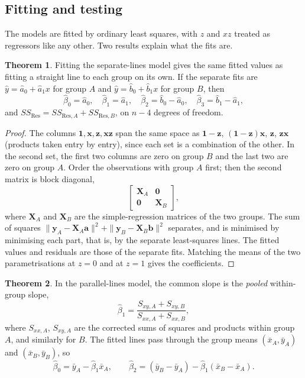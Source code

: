 \documentclass[11pt,a4paper]{article}
\numberwithin{equation}{section}
\theoremstyle{definition}
\newtheorem{thm}{Theorem}[subsection]
\begin{document}
\subsection{Fitting and testing}
The models are fitted by ordinary least squares, with $z$ and $xz$ treated as regressors like any other.
Two results explain what the fits are.

\begin{thm}\label{thm:separate-lines}
Fitting the separate-lines model gives the same fitted values as fitting a straight line to each group
on its own. If the separate fits are $\hat y = \hat a_0 + \hat a_1x$ for group $A$ and $\hat y = \hat b_0 + \hat b_1x$ for
group $B$, then
\[
\hat\beta_0 = \hat a_0, \quad \hat\beta_1 = \hat a_1, \quad \hat\beta_2 = \hat b_0 - \hat a_0, \quad \hat\beta_3 = \hat b_1 - \hat a_1 ,
\]
and $SS_{\mathrm{Res}} = SS_{\mathrm{Res},A} + SS_{\mathrm{Res},B}$, on $n - 4$ degrees of freedom.
\end{thm}

\begin{proof}
The columns $\mathbf{1}, \mathbf{x}, \mathbf{z}, \mathbf{xz}$ span the same space as $\mathbf{1} - \mathbf{z}$, $(\mathbf{1} - \mathbf{z})\mathbf{x}$,
$\mathbf{z}$, $\mathbf{zx}$ (products taken entry by entry), since each set is a combination of the other. In the
second set, the first two columns are zero on group $B$ and the last two are zero on group $A$. Order the
observations with group $A$ first; then the second matrix is block diagonal,
\[
\begin{bmatrix} \mathbf{X}_A & \mathbf{0} \\ \mathbf{0} & \mathbf{X}_B \end{bmatrix} ,
\]
where $\mathbf{X}_A$ and $\mathbf{X}_B$ are the simple-regression matrices of the two groups. The sum of squares
$\|\mathbf{y}_A - \mathbf{X}_A\mathbf{a}\|^2 + \|\mathbf{y}_B - \mathbf{X}_B\mathbf{b}\|^2$ separates, and is minimised by minimising each part,
that is, by the separate least-squares lines. The fitted values and residuals are those of the separate fits.
Matching the means of the two parametrisations at $z = 0$ and at $z = 1$ gives the coefficients.
\end{proof}

\begin{thm}\label{thm:parallel-lines}
In the parallel-lines model, the common slope is the \emph{pooled} within-group slope,
\[
\hat\beta_1 = \frac{S_{xy,A} + S_{xy,B}}{S_{xx,A} + S_{xx,B}} ,
\]
where $S_{xx,A}$, $S_{xy,A}$ are the corrected sums of squares and products within group $A$, and similarly for
$B$. The fitted lines pass through the group means $(\bar x_A, \bar y_A)$ and $(\bar x_B, \bar y_B)$, so
\[
\hat\beta_0 = \bar y_A - \hat\beta_1\bar x_A , \qquad
\hat\beta_2 = (\bar y_B - \bar y_A) - \hat\beta_1(\bar x_B - \bar x_A) .
\]
\end{thm}
\end{document}

